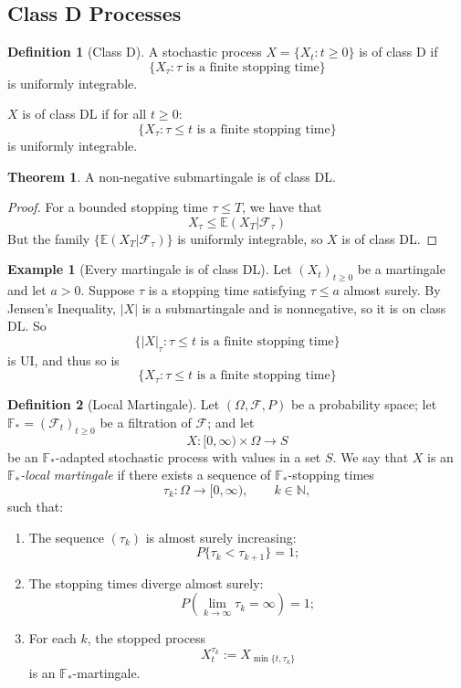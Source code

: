 \documentclass[11pt,a4paper]{article}
\theoremstyle{definition}
\newtheorem{definition}{Definition}[section]
\newtheorem{theorem}{Theorem}[section]
\newtheorem{example}{Example}[section]
\begin{document}
\subsection{Class D Processes}

\begin{definition}[Class D]\label{def:class_d}
A stochastic process $X = \{X_t : t \geq 0\}$ is of class D if
\[
\{X_\tau : \tau \text{ is a finite stopping time}\}
\]
is uniformly integrable.

$X$ is of class DL if for all $t \geq 0$:
\[
\{X_\tau : \tau \leq t \text{ is a finite stopping time}\}
\]
is uniformly integrable.
\end{definition}


\begin{theorem}
A non-negative submartingale is of class DL.
\end{theorem}

\begin{proof}
For a bounded stopping time $\tau \le T$, we have that \[
X_\tau \le \mathbb{E}(X_T | \mathcal{F}_\tau)
\]
But the family $\{\mathbb{E}(X_T | \mathcal{F}_\tau)\}$ is uniformly integrable, so $X$ is of class DL.
\end{proof}


\begin{example}[Every martingale is of class DL]
Let $(X_t)_{t\ge0}$ be a martingale and let $a>0$.
Suppose $\tau$ is a stopping time satisfying $\tau \le a$ almost surely. By Jensen's Inequality, $|X|$ is a submartingale and is nonnegative, so it is on class DL. So \[
\{|X|_\tau : \tau \le t \text{ is a finite stopping time}\}
\]
is UI, and thus so is 
\[
\{X_\tau : \tau \le t \text{ is a finite stopping time}\}
\]
\end{example}

\begin{definition}[Local Martingale]
Let $(\Omega, \mathcal{F}, P)$ be a probability space; let 
$\mathbb{F}_* = (\mathcal{F}_t)_{t \ge 0}$ be a filtration of $\mathcal{F}$; 
and let 
\[
X : [0,\infty) \times \Omega \to S
\]
be an $\mathbb{F}_*$-adapted stochastic process with values in a set $S$.
We say that $X$ is an \emph{$\mathbb{F}_*$-local martingale} if there exists
a sequence of $\mathbb{F}_*$-stopping times
\[
\tau_k : \Omega \to [0,\infty), \qquad k \in \mathbb{N},
\]
such that:
\begin{enumerate}
    \item The sequence $(\tau_k)$ is almost surely increasing:
    \[
    P\{\tau_k < \tau_{k+1}\} = 1;
    \]
    \item The stopping times diverge almost surely:
    \[
    P\!\left( \lim_{k \to \infty} \tau_k = \infty \right) = 1;
    \]
    \item For each $k$, the stopped process
    \[
    X^{\tau_k}_t := X_{\min\{t,\tau_k\}}
    \]
    is an $\mathbb{F}_*$-martingale.
\end{enumerate}
\end{definition}
\end{document}
